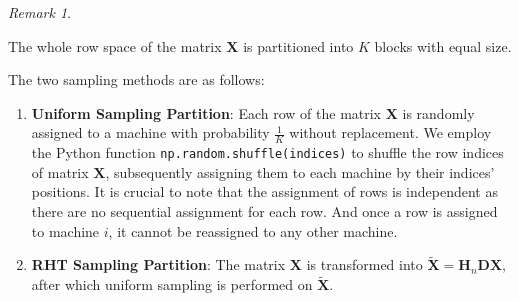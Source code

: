 \documentclass[11pt]{article}
\numberwithin{equation}{section}
\theoremstyle{plain}
\theoremstyle{definition}
\theoremstyle{remark}
\newtheorem{remark}[theorem]{Remark}
\begin{document}
\begin{remark}
\label{remark:sampling}

The whole row space of the matrix $\mathbf{X}$ is partitioned into $K$ blocks with equal size.

The two sampling methods are as follows:

\begin{enumerate}
  \item \textbf{Uniform Sampling Partition}:
  Each row of the matrix $\mathbf{X}$ is randomly assigned to a machine with probability $\frac{1}{K}$ without replacement.
  We employ the Python function \texttt{np.random.shuffle(indices)} to shuffle the row indices of matrix $\mathbf{X}$, subsequently assigning them to each machine by their indices' positions.
  It is crucial to note that the assignment of rows is independent as there are no sequential assignment for each row. And once a row is assigned to machine $i$, it cannot be reassigned to any other machine.
  
  \item \textbf{RHT Sampling Partition}:
  The matrix $\mathbf{X}$ is transformed into $\mathbf{\tilde{X}} = \mathbf{H}_n\mathbf{D}\mathbf{X}$, after which uniform sampling is performed on $\mathbf{\tilde{X}}$.
\end{enumerate}
\end{remark}
\end{document}
